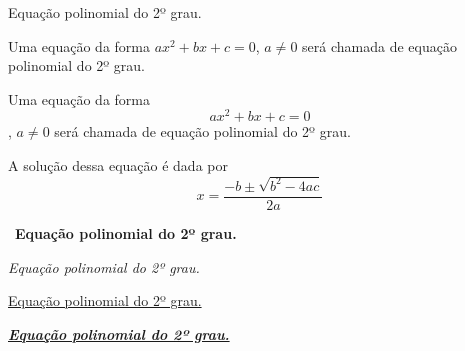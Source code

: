 \documentclass[a4paper, 12pt]{article}
\begin{document}




Equação polinomial do 2º grau.

Uma equação da forma $ax^2 + bx + c = 0$, $a \neq 0$ será chamada de equação polinomial do 2º grau.


Uma equação da forma $$ax^2 + bx + c = 0$$, $a \neq 0$ será chamada de equação polinomial do 2º grau.

A solução dessa equação é dada por
$$ x = \frac{-b \pm \sqrt{b^2 - 4ac}}{2a} $$

\begin{center}\
\textbf{Equação polinomial do 2º grau.}
\end{center}

\begin{flushright}
\textit{Equação polinomial do 2º grau.}
\end{flushright}

\begin{flushleft}
\underline{Equação polinomial do 2º grau.}
\end{flushleft}

\begin{flushleft}
\underline{\textbf{\textit{Equação polinomial do 2º grau.}}}
\end{flushleft}
\end{document}
